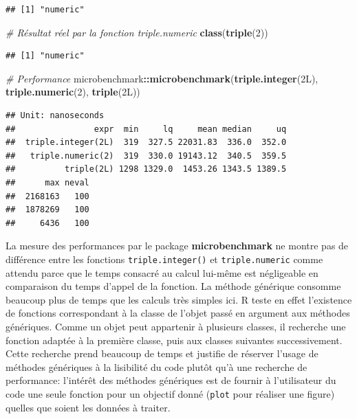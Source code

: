 \documentclass[
  12pt,
  french,
  a4paper,
  extrafontsizes,onecolumn,openright
  ]{memoir}
\newenvironment{Shaded}{\begin{snugshade}}{\end{snugshade}}
\newcommand{\CommentTok}[1]{\textcolor[rgb]{0.56,0.35,0.01}{\textit{#1}}}
\newcommand{\DecValTok}[1]{\textcolor[rgb]{0.00,0.00,0.81}{#1}}
\newcommand{\KeywordTok}[1]{\textcolor[rgb]{0.13,0.29,0.53}{\textbf{#1}}}
\newcommand{\NormalTok}[1]{#1}
\newcommand{\OperatorTok}[1]{\textcolor[rgb]{0.81,0.36,0.00}{\textbf{#1}}}
\newlength{\rf}
\begin{document}
\begin{verbatim}
## [1] "numeric"
\end{verbatim}

\begin{Shaded}
\begin{Highlighting}[]
\CommentTok{# Résultat réel par la fonction triple.numeric}
\KeywordTok{class}\NormalTok{(}\KeywordTok{triple}\NormalTok{(}\DecValTok{2}\NormalTok{))}
\end{Highlighting}
\end{Shaded}

\begin{verbatim}
## [1] "numeric"
\end{verbatim}

\begin{Shaded}
\begin{Highlighting}[]
\CommentTok{# Performance}
\NormalTok{microbenchmark}\OperatorTok{::}\KeywordTok{microbenchmark}\NormalTok{(}\KeywordTok{triple.integer}\NormalTok{(2L), }\KeywordTok{triple.numeric}\NormalTok{(}\DecValTok{2}\NormalTok{),}
    \KeywordTok{triple}\NormalTok{(2L))}
\end{Highlighting}
\end{Shaded}

\begin{verbatim}
## Unit: nanoseconds
##                expr  min     lq     mean median     uq
##  triple.integer(2L)  319  327.5 22031.83  336.0  352.0
##   triple.numeric(2)  319  330.0 19143.12  340.5  359.5
##          triple(2L) 1298 1329.0  1453.26 1343.5 1389.5
##      max neval
##  2168163   100
##  1878269   100
##     6436   100
\end{verbatim}

\normalsize

La mesure des performances par le package \textbf{microbenchmark} ne montre pas de différence entre les fonctions \texttt{triple.integer()} et \texttt{triple.numeric} comme attendu parce que le temps consacré au calcul lui-même est négligeable en comparaison du temps d'appel de la fonction.
La méthode générique consomme beaucoup plus de temps que les calculs très simples ici.
R teste en effet l'existence de fonctions correspondant à la classe de l'objet passé en argument aux méthodes génériques.
Comme un objet peut appartenir à plusieurs classes, il recherche une fonction adaptée à la première classe, puis aux classes suivantes successivement.
Cette recherche prend beaucoup de temps et justifie de réserver l'usage de méthodes génériques à la lisibilité du code plutôt qu'à une recherche de performance: l'intérêt des méthodes génériques est de fournir à l'utilisateur du code une seule fonction pour un objectif donné (\texttt{plot} pour réaliser une figure) quelles que soient les données à traiter.
\end{document}
